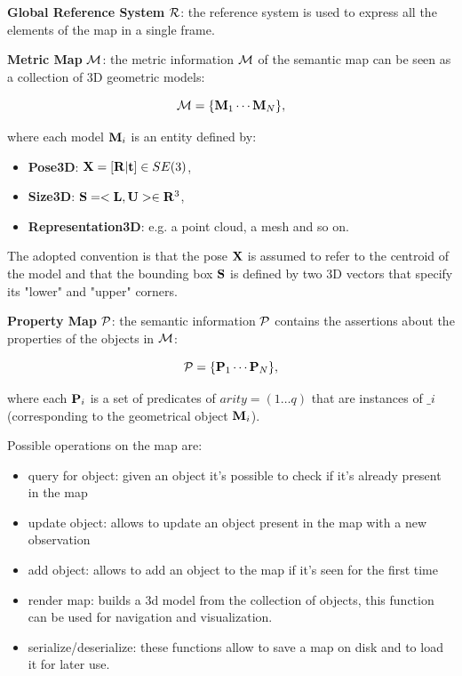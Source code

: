 \documentclass{article}
\begin{document}
	\begin{description}
		\item {\bf Global Reference System} $\mathcal{R}$: the reference system is used to express all the elements of the map in a single frame.
		\item {\bf Metric Map} $\mathcal{M}$: the metric information $\mathcal{M}$ of the semantic map can be seen as a collection of 3D geometric models:
		
		\begin{equation}
		\mathcal{M} = \{\mathbf{M}_1 \cdots \mathbf{M}_N\},
		\end{equation}
		
		\noindent	
		where each model $\mathbf{M}_i$ is an entity defined by:
		
		\begin{itemize}
			\item {\bf Pose3D}: $\mathbf{X} = [ \mathbf{R} | \mathbf{t}] \in SE(3)$,
			\item {\bf Size3D}: $\mathbf{S} = <\mathbf{L} ,\mathbf{U}> \in \mathbf{R}^3 $,
			\item {\bf Representation3D}: e.g. a point cloud, a mesh and so on.
		\end{itemize}
		
		The adopted convention is that the pose $\mathbf{X}$ is assumed to refer to the centroid of the model and that the bounding box $\mathbf{S}$ is defined by two 3D vectors that specify its "lower" and "upper" corners.
		\item {\bf Property Map} $\mathcal{P}$: the semantic information $\mathcal{P}$ contains the assertions about the properties of the objects in $\mathcal{M}$:
		
		\begin{equation}
		\mathcal{P} = \{\mathbf{P}_1 \cdots \mathbf{P}_N\},
		\end{equation}
		
		\noindent
		where each $\mathbf{P}_i$ is a set of predicates of $arity = (1 \dots q)$ that are instances of $\bm_i$ (corresponding to the geometrical object $\mathbf{M}_i$).
	\end{description}
	

	\noindent
	Possible operations on the map are:
	
	\begin{itemize}
		\item query for object: given an object it's possible to check if it's already present in the map
		\item update object: allows to update an object present in the map with a new observation
		\item add object: allows to add an object to the map if it's seen for the first time
		\item render map: builds a 3d model from the collection of objects, this function can be used for navigation and visualization.
		\item serialize/deserialize: these functions allow to save a map on disk and to load it for later use.
	\end{itemize}
	
\end{document}
